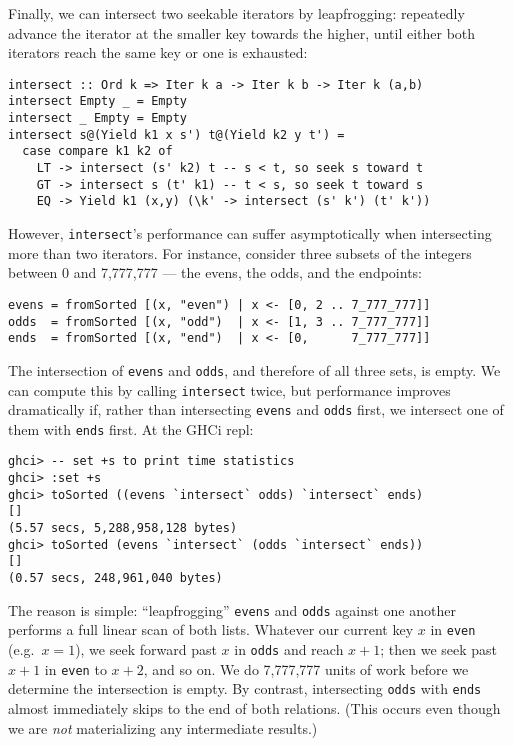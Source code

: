 \documentclass[acmsmall,screen,review,anonymous,dvipsnames,svgnames]{acmart}
\newcommand\ttt\texttt
\begin{document}
\noindent
Finally, we can intersect two seekable iterators by leapfrogging: repeatedly advance the iterator at the smaller key towards the higher, until either both iterators reach the same key or one is exhausted:

\begin{verbatim}
intersect :: Ord k => Iter k a -> Iter k b -> Iter k (a,b)
intersect Empty _ = Empty
intersect _ Empty = Empty
intersect s@(Yield k1 x s') t@(Yield k2 y t') =
  case compare k1 k2 of
    LT -> intersect (s' k2) t -- s < t, so seek s toward t
    GT -> intersect s (t' k1) -- t < s, so seek t toward s
    EQ -> Yield k1 (x,y) (\k' -> intersect (s' k') (t' k'))
\end{verbatim}

\noindent
However, \ttt{intersect}'s performance can suffer asymptotically when intersecting more than two iterators.
For instance, consider three subsets of the integers between 0 and 7,777,777 --- the evens, the odds, and the endpoints:

\begin{verbatim}
evens = fromSorted [(x, "even") | x <- [0, 2 .. 7_777_777]]
odds  = fromSorted [(x, "odd")  | x <- [1, 3 .. 7_777_777]]
ends  = fromSorted [(x, "end")  | x <- [0,      7_777_777]]
\end{verbatim}

\noindent
The intersection of \ttt{evens} and \ttt{odds}, and therefore of all three sets, is empty.
We can compute this by calling \ttt{intersect} twice, but performance improves dramatically if, rather than intersecting \ttt{evens} and \ttt{odds} first, we intersect one of them with \ttt{ends} first.
At the GHCi repl:

\begin{verbatim}
ghci> -- set +s to print time statistics
ghci> :set +s
ghci> toSorted ((evens `intersect` odds) `intersect` ends)
[]
(5.57 secs, 5,288,958,128 bytes)
ghci> toSorted (evens `intersect` (odds `intersect` ends))
[]
(0.57 secs, 248,961,040 bytes)
\end{verbatim}

\noindent
The reason is simple: ``leapfrogging'' \ttt{evens} and \ttt{odds} against one another performs a full linear scan of both lists.
Whatever our current key $x$ in \ttt{even} (e.g.\ $x = 1$), we seek forward past $x$ in \ttt{odds} and reach $x+1$; then we seek past $x+1$ in \ttt{even} to $x + 2$, and so on.
We do 7,777,777 units of work before we determine the intersection is empty.
%
By contrast, intersecting \ttt{odds} with \ttt{ends} almost immediately skips to the end of both relations.
(This occurs even though we are \emph{not} materializing any intermediate results.)%
\footnotemark{}
\end{document}
